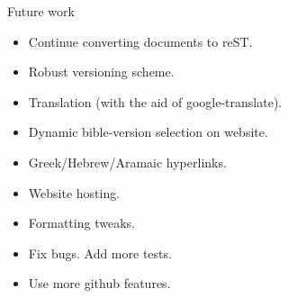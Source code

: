 \documentclass{beamer}
\begin{document}
\begin{frame}{Future work}
\begin{itemize}
\item Continue converting documents to reST.
\item Robust versioning scheme.
\item Translation (with the aid of google-translate).
\item Dynamic bible-version selection on website.
\item Greek/Hebrew/Aramaic hyperlinks.
\item Website hosting.
\item Formatting tweaks.
\item Fix bugs. Add more tests.
\item Use more github features.
\end{itemize}

\end{frame}
\end{document}
